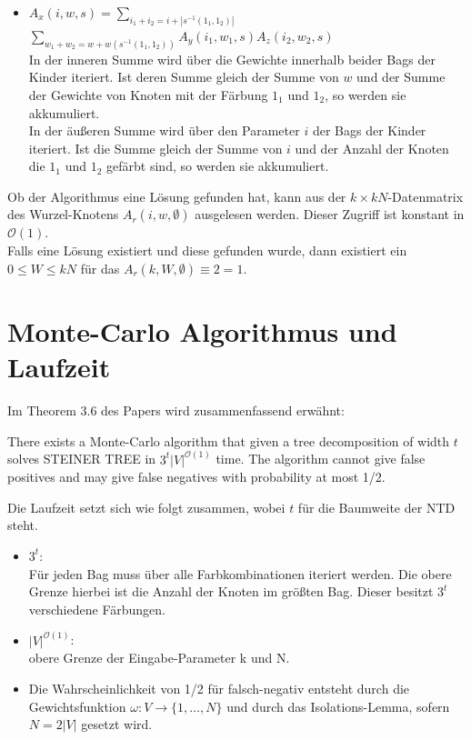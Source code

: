 \begin{itemize}
\begin{itemize}
\item $A_x(i,w,s) = \sum\limits_{i_1+i_2=i+|s^{-1}({1_1,1_2})|}$   $\sum\limits_{w_1+w_2=w+w(s^{-1}({1_1,1_2}))} A_y(i_1,w_1,s)A_z(i_2,w_2,s) $\\In der inneren Summe wird über die Gewichte innerhalb beider Bags der Kinder iteriert. Ist deren Summe gleich der Summe von $w$ und der Summe der Gewichte von Knoten mit der Färbung $1_1$ und $1_2$, so werden sie akkumuliert.
\\In der äußeren Summe wird über den Parameter $i$ der Bags der Kinder iteriert. Ist die Summe gleich der Summe von $i$ und der Anzahl der Knoten die $1_1$ und $1_2$ gefärbt sind, so werden sie akkumuliert.
\end{itemize}
\end{itemize}


Ob der Algorithmus eine Lösung gefunden hat, kann aus der $k \times kN$-Datenmatrix des Wurzel-Knotens $A_r(i,w,\emptyset)$ ausgelesen werden. 
Dieser Zugriff ist konstant in $\mathcal{O}(1)$.\\
Falls eine Lösung existiert und diese gefunden wurde, dann existiert ein $0 \leq W \leq kN$ für das $A_r(k,W,\emptyset) \equiv 2 = 1$.

\section{Monte-Carlo Algorithmus und Laufzeit}
\label{sec:mc_alg}
Im Theorem 3.6 des Papers wird zusammenfassend erwähnt:
\begin{theorem}
There exists a Monte-Carlo algorithm that given a tree decomposition of width $t$ solves STEINER TREE in $3^t|V|^{\mathcal{O}(1)}$ time. The algorithm cannot give false positives and may give false negatives with probability at most 1/2.
\end{theorem}

Die Laufzeit setzt sich wie folgt zusammen, wobei $t$ für die Baumweite der NTD steht.
\begin{itemize}
\item $3^t$:\\ Für jeden Bag muss über alle Farbkombinationen iteriert werden. Die obere Grenze hierbei ist die Anzahl der Knoten im größten Bag. Dieser besitzt $3^t$ verschiedene Färbungen.
\item $|V|^{\mathcal{O}(1)}$:\\ obere Grenze der Eingabe-Parameter k und N.
\item Die Wahrscheinlichkeit von 1/2 für falsch-negativ entsteht durch die Gewichtsfunktion $\omega:V\rightarrow \{1,\dots,N\}$ und durch das Isolations-Lemma, sofern $N=2|V|$ gesetzt wird. 
\end{itemize}